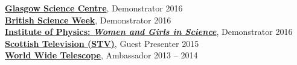 \documentclass[11pt]{article}
\newcommand{\halfblankline}{\quad\vspace{-0.5\baselineskip}\pagebreak[3]}
\begin{document}
{\bf \href{http://www.glasgowsciencecentre.org/}{Glasgow Science Centre}}, Demonstrator \hfill 2016  \\
{\bf \href{https://www.britishscienceweek.org/}{British Science Week}}, Demonstrator \hfill 2016 \\
{\bf \href{http://www.gla.ac.uk/explore/scienceconnects/news/headline_451512_en.html}{Institute of Physics: {\it Women and Girls in Science}}}, Demonstrator \hfill 2016 \\
{\bf \href{http://www.stv.tv/}{Scottish Television (STV)}}, Guest Presenter \hfill 2015 \\
{\bf \href{http://www.worldwidetelescope.org/}{World Wide Telescope}}, Ambassador \hfill 2013 -- 2014
%
%
\end{document}
